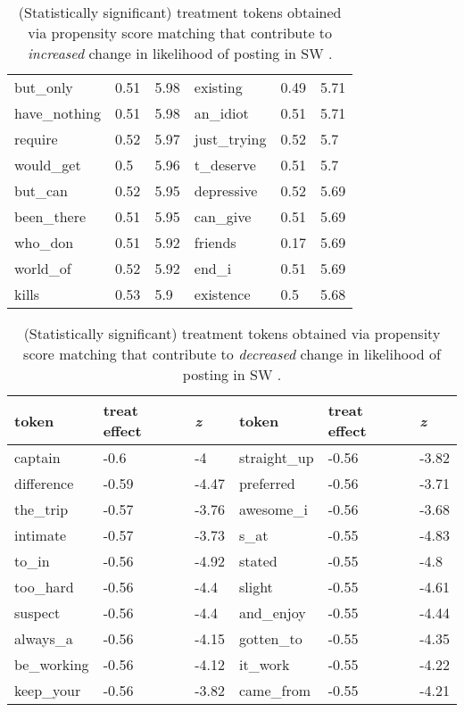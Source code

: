 \begin{table}[h!]
\begin{tabularx}{\textwidth}{XXX|XXX}
but\_only & 0.51 &  5.98 & existing & 0.49 & 5.71\\ 
have\_nothing & 0.51 &5.98  & an\_idiot & 0.51 & 5.71\\ 
require & 0.52 &  5.97 & just\_trying & 0.52 & 5.7\\ 
would\_get & 0.5 &  5.96  & t\_deserve & 0.51 & 5.7\\ 
but\_can & 0.52 & 5.95  & depressive & 0.52 & 5.69\\ 
been\_there & 0.51 & 5.95  & can\_give & 0.51 & 5.69\\ 
who\_don & 0.51 & 5.92  & friends & 0.17 & 5.69\\ 
world\_of & 0.52 & 5.92  & end\_i & 0.51 & 5.69\\ 
kills & 0.53 &  5.9 & existence & 0.5 & 5.68\\ 
\bottomrule
\end{tabularx}
\caption{(Statistically significant) treatment tokens obtained via propensity score matching that contribute to \textit{increased} change in likelihood of posting in SW \cite{DeChoudhury2016}.}
\label{tab:postive_token}
\end{table}
\begin{table}[h!]
\noindent\begin{tabularx}{\textwidth}{XXX|XXX}
\toprule
token & treat effect & \textit{z} & token & treat effect & \textit{z} \\
\midrule
captain & -0.6 & -4 & straight\_up & -0.56 & -3.82\\ 
difference & -0.59 &  -4.47& preferred& -0.56 & -3.71\\ 
the\_trip & -0.57& -3.76 & awesome\_i & -0.56 & -3.68\\ 
intimate &-0.57 & -3.73 & s\_at & -0.55 & -4.83\\ 
to\_in &-0.56 &  -4.92 & stated & -0.55 & -4.8\\ 
too\_hard & -0.56 &  -4.4 & slight &-0.55 & -4.61\\ 
suspect &-0.56 &  -4.4 & and\_enjoy &-0.55& -4.44\\ 
always\_a & -0.56 &  -4.15 & gotten\_to & -0.55& -4.35\\ 
be\_working & -0.56 &  -4.12 & it\_work & -0.55 & -4.22\\ 
keep\_your & -0.56 &  -3.82 & came\_from & -0.55 & -4.21\\ 
\bottomrule
\end{tabularx}
\caption{(Statistically significant) treatment tokens obtained via propensity score matching that contribute to \textit{decreased} change in likelihood of posting in SW \cite{DeChoudhury2016}.}
\label{tab:negative_token}
\end{table}
